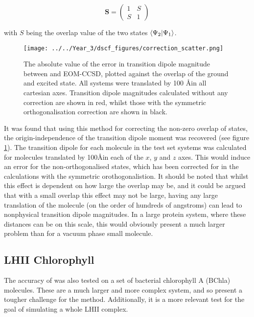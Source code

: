 \begin{equation}
\mathbf{S} = \begin{pmatrix}
    1 & S \\
    S & 1 
\end{pmatrix}
\end{equation}

with $S$ being the overlap value of the two states $\braket{\Psi_2|\Psi_1}$.

\begin{figure}
\centering
\texttt{[image: ../../Year\_3/dscf\_figures/correction\_scatter.png]}
\label{fig:correction_scatter}
\caption{The absolute value of the error in transition dipole magnitude between
\dscf and EOM-CCSD, plotted against the \dscf overlap of the ground and excited
state. All systems were translated by 100 \AA   in all cartesian axes. Transition
dipole magnitudes calculated without any correction are shown in red, whilst
those with the symmetric orthogonalisation correction are shown in black.}
\end{figure}

It was found that using this method for correcting the non-zero overlap of states, 
the origin-independence of the transition dipole moment was recovered (see figure
\ref{fig:correction_scatter}).
The transition dipole for each molecule in the test set systems was calculated
for molecules translated by 100\AA  in each of the $x$, $y$ and $z$ axes.
This would induce an error for the non-orthogonalised states, which has been
corrected for in the calculations with the symmetric orothogonalistion.
It should be noted that whilst this effect is dependent on how large the overlap may be, and
it could be argued that with a small overlap this effect may not be large, having 
any large translation of the molecule (on the order of hundreds of angstroms) can
lead to nonphysical transition dipole magnitudes. In a large protein system, where
these distances can be on this scale, this would obviously present a much larger problem
than for a vacuum phase small molecule.

\subsection{LHII Chlorophyll}
\label{subsec:dscf_chl_tests}
The accuracy of \dscf was also tested on a set of bacterial chlorophyll A (BChla) 
molecules. These are a much larger and more complex system, and so present a tougher
challenge for the \dscf method. Additionally, it is a more relevant test for the
goal of simulating a whole LHII complex.

